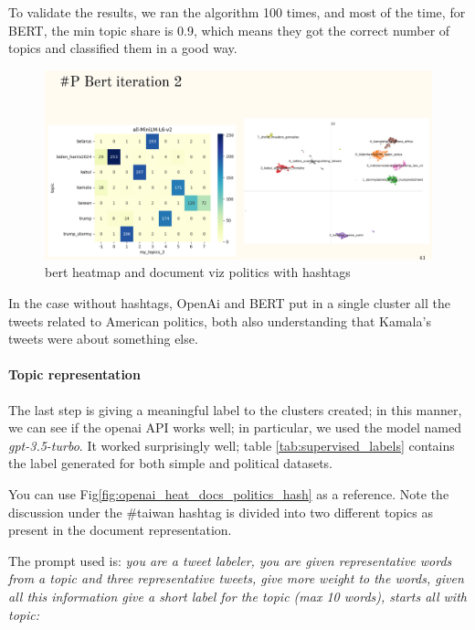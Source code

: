 To validate the results, we ran the algorithm 100 times, and most of the time, for BERT, the min topic share is 0.9, which means they got the correct number of topics and classified them in a good way.

\begin{figure}
    \centering
    \includegraphics[width=1\linewidth]{Chapter4/figures/bert_politics_hash_comparison.png}
    \caption{bert heatmap and document viz politics with hashtags}
    \label{fig:bert politics with hashtags}
\end{figure}

In the case without hashtags, OpenAi and BERT put in a single cluster all the tweets related to American politics, both also understanding that Kamala's tweets were about something else.


\paragraph{Topic representation}
The last step is giving a meaningful label to the clusters created; in this manner, we can see if the openai API works well; in particular, we used the model named \textit{gpt-3.5-turbo}. It worked surprisingly well; table \ref{tab:supervised_labels} contains the label generated for both simple and political datasets.

You can use Fig\ref{fig:openai_heat_docs_politics_hash} as a reference. Note the discussion under the \#taiwan hashtag is divided into two different topics as present in the document representation.

The prompt used is: \textit{you are a tweet labeler, you are given representative words from a topic and three representative tweets, give more weight to the words, given all this information give a short label for the topic (max 10 words), starts all with topic:}


